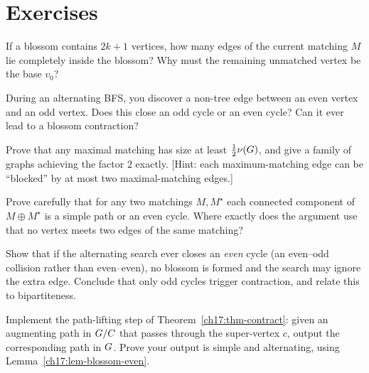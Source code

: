 \section{Exercises}

\begin{exercise}
If a blossom contains $2k+1$ vertices, how many edges of the current matching $M$ lie completely inside the blossom? Why must the remaining unmatched vertex be the base $v_0$?
\end{exercise}

\begin{exercise}
During an alternating BFS, you discover a non-tree edge between an even vertex and an odd vertex. Does this close an odd cycle or an even cycle? Can it ever lead to a blossom contraction?
\end{exercise}

\begin{exercise}
\label{ch17:ex-maximal}
Prove that any maximal matching has size at least $\tfrac12\nu(G)$, and give a family of graphs
achieving the factor $2$ exactly. [Hint: each maximum-matching edge can be ``blocked'' by at most two
maximal-matching edges.]
\end{exercise}

\begin{exercise}
\label{ch17:ex-berge}
Prove carefully that for any two matchings $M,M^{\star}$ each connected component of $M\oplus
M^{\star}$ is a simple path or an even cycle. Where exactly does the argument use that no vertex meets
two edges of the same matching?
\end{exercise}

\begin{exercise}
\label{ch17:ex-evencycle}
Show that if the alternating search ever closes an \emph{even} cycle (an even--odd collision rather
than even--even), no blossom is formed and the search may ignore the extra edge. Conclude that
only odd cycles trigger contraction, and relate this to bipartiteness.
\end{exercise}

\begin{exercise}
\label{ch17:ex-lift}
Implement the path-lifting step of Theorem~\ref{ch17:thm-contract}: given an augmenting path in
$G/C$ that passes through the super-vertex $c$, output the corresponding path in $G$. Prove your
output is simple and alternating, using Lemma~\ref{ch17:lem-blossom-even}.
\end{exercise}

